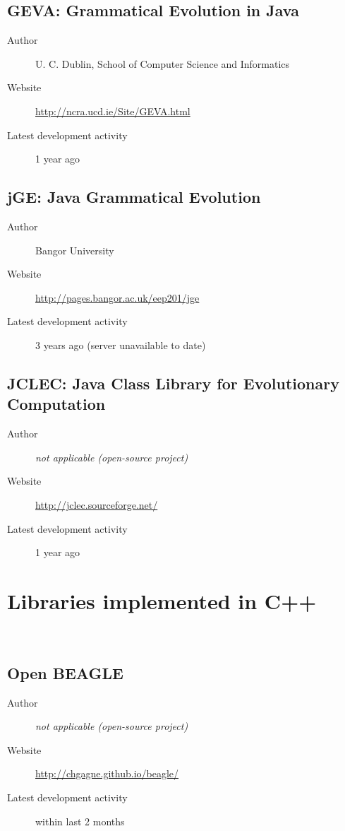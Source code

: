 \subsection*{GEVA: Grammatical Evolution in Java}
\begin{description}
    \item[Author] U. C. Dublin, School of Computer Science and Informatics
    \item[Website] \url{http://ncra.ucd.ie/Site/GEVA.html}
    \item[Latest development activity] 1 year ago
\end{description}


\subsection*{jGE: Java Grammatical Evolution}
\begin{description}
    \item[Author] Bangor University
    \item[Website] \url{http://pages.bangor.ac.uk/eep201/jge}
    \item[Latest development activity] 3 years ago (server unavailable to date)
\end{description}


\subsection*{JCLEC: Java Class Library for Evolutionary Computation}
\begin{description}
    \item[Author] \textit{not applicable (open-source project)}
    \item[Website] \url{http://jclec.sourceforge.net/}
    \item[Latest development activity] 1 year ago
\end{description}


\section{Libraries implemented in C++}~\label{section:libraries-cpp}
\subsection*{Open BEAGLE}
\begin{description}
    \item[Author] \textit{not applicable (open-source project)}
    \item[Website] \url{http://chgagne.github.io/beagle/}
    \item[Latest development activity] within last 2 months
\end{description}


